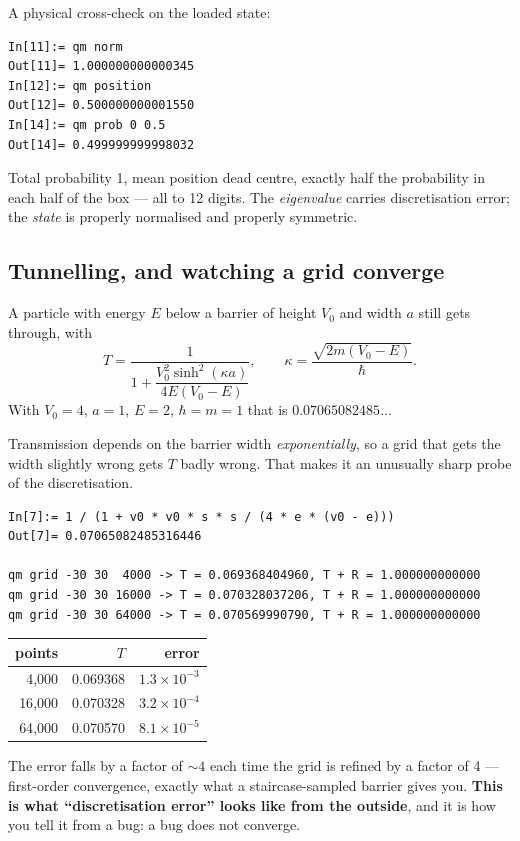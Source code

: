 \documentclass[11pt]{article}
\begin{document}
A physical cross-check on the loaded state:

\begin{lstlisting}
In[11]:= qm norm
Out[11]= 1.000000000000345
In[12]:= qm position
Out[12]= 0.500000000001550
In[14]:= qm prob 0 0.5
Out[14]= 0.499999999998032
\end{lstlisting}

Total probability 1, mean position dead centre, exactly half the
probability in each half of the box --- all to 12 digits. The
\emph{eigenvalue} carries discretisation error; the \emph{state} is
properly normalised and properly symmetric.

\subsection{Tunnelling, and watching a grid converge}

A particle with energy $E$ below a barrier of height $V_0$ and width $a$
still gets through, with
\[
T = \frac{1}{1 + \dfrac{V_0^2\sinh^2(\kappa a)}{4E(V_0-E)}},
\qquad \kappa = \frac{\sqrt{2m(V_0-E)}}{\hbar}.
\]
With $V_0=4$, $a=1$, $E=2$, $\hbar=m=1$ that is $0.07065082485\ldots$

Transmission depends on the barrier width \emph{exponentially}, so a
grid that gets the width slightly wrong gets $T$ badly wrong. That makes
it an unusually sharp probe of the discretisation.

\begin{lstlisting}
In[7]:= 1 / (1 + v0 * v0 * s * s / (4 * e * (v0 - e)))
Out[7]= 0.07065082485316446

qm grid -30 30  4000 -> T = 0.069368404960, T + R = 1.000000000000
qm grid -30 30 16000 -> T = 0.070328037206, T + R = 1.000000000000
qm grid -30 30 64000 -> T = 0.070569990790, T + R = 1.000000000000
\end{lstlisting}

\begin{center}
\begin{tabular}{rrr}
\textbf{points} & \textbf{$T$} & \textbf{error}\\\hline
4{,}000  & 0.069368 & $1.3\times10^{-3}$\\
16{,}000 & 0.070328 & $3.2\times10^{-4}$\\
64{,}000 & 0.070570 & $8.1\times10^{-5}$\\
\end{tabular}
\end{center}

The error falls by a factor of $\sim4$ each time the grid is refined by
a factor of 4 --- first-order convergence, exactly what a
staircase-sampled barrier gives you. \textbf{This is what
``discretisation error'' looks like from the outside}, and it is how you
tell it from a bug: a bug does not converge.
\end{document}
